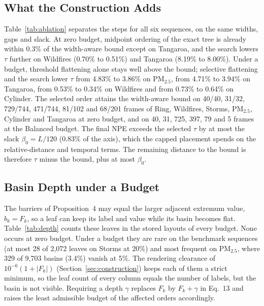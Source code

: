 \documentclass[preprint]{vgtc}
\begin{document}
\subsection{What the Construction Adds}\label{sec:increments}

Table~\ref{tab:ablation} separates the steps for all six sequences, on the same widths, gaps and slack. At zero budget, midpoint ordering of the exact tree is already within 0.3\% of the width-aware bound except on Tangaroa, and the search lowers $\tau$ further on Wildfires (0.70\% to 0.51\%) and Tangaroa (8.19\% to 8.00\%). Under a budget, threshold flattening alone stays well above the bound; selective flattening and the search lower $\tau$ from 4.83\% to 3.86\% on PM$_{2.5}$, from 4.71\% to 3.94\% on Tangaroa, from 0.53\% to 0.34\% on Wildfires and from 0.73\% to 0.64\% on Cylinder. The selected order attains the width-aware bound on 40/40, 31/32, 729/744, 471/744, 81/102 and 68/201 frames of Ring, Wildfires, Storms, PM$_{2.5}$, Cylinder and Tangaroa at zero budget, and on 40, 31, 725, 397, 79 and 5 frames at the Balanced budget. The final NPE exceeds the selected $\tau$ by at most the slack $\beta_0=L/120$ (0.83\% of the axis), which the capped placement spends on the relative-distance and temporal terms. The remaining distance to the bound is therefore $\tau$ minus the bound, plus at most $\beta_0$.

\subsection{Basin Depth under a Budget}\label{sec:basin-depth}

The barriers of Proposition~4 may equal the larger adjacent extremum value, $b_k=F_k$, so a leaf can keep its label and value while its basin becomes flat. Table~\ref{tab:depth} counts these leaves in the stored layouts of every budget. None occurs at zero budget. Under a budget they are rare on the benchmark sequences (at most 28 of 2,072 leaves on Storms at 20\%) and most frequent on PM$_{2.5}$, where 329 of 9,703 basins (3.4\%) vanish at 5\%. The rendering clearance of $10^{-6}(1+|F_k|)$ (Section~\ref{sec:construction}) keeps each of them a strict minimum, so the leaf count of every column equals the number of labels, but the basin is not visible. Requiring a depth $\gamma$ replaces $F_k$ by $F_k+\gamma$ in Eq.~13 and raises the least admissible budget of the affected orders accordingly.
\end{document}
